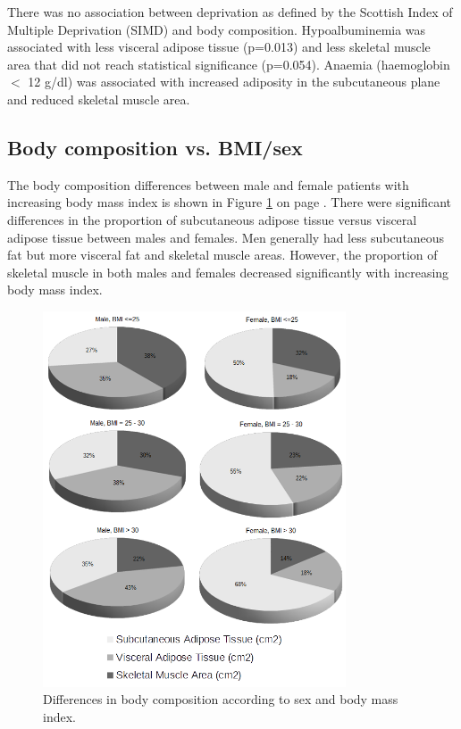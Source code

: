 There was no association between deprivation as defined by the Scottish Index of Multiple Deprivation (SIMD) and body composition.
Hypoalbuminemia was associated with less visceral adipose tissue (p=0.013) and less skeletal muscle area that did not reach statistical significance (p=0.054). 
Anaemia (haemoglobin $<$ 12 g/dl) was associated with increased adiposity in the subcutaneous plane and reduced skeletal muscle area. 
	

\subsection{Body composition vs. BMI/sex}
The body composition differences between male and female patients with increasing body mass index is shown in Figure \ref{fig:bc_gender_bmi} on page \pageref{fig:bc_gender_bmi}. 
There were significant differences in the proportion of subcutaneous adipose tissue versus visceral adipose tissue between males and females. 
Men generally had less subcutaneous fat but more visceral fat and skeletal muscle areas. 
However, the proportion of skeletal muscle in both males and females decreased significantly with increasing body mass index.

\begin{figure}[h]
	\centering
	\includegraphics[width=0.8\textwidth]{Figures/bc_gender_bmi_pie}
	\caption{Differences in body composition according to sex and body mass index.}
	\label{fig:bc_gender_bmi}
\end{figure}

